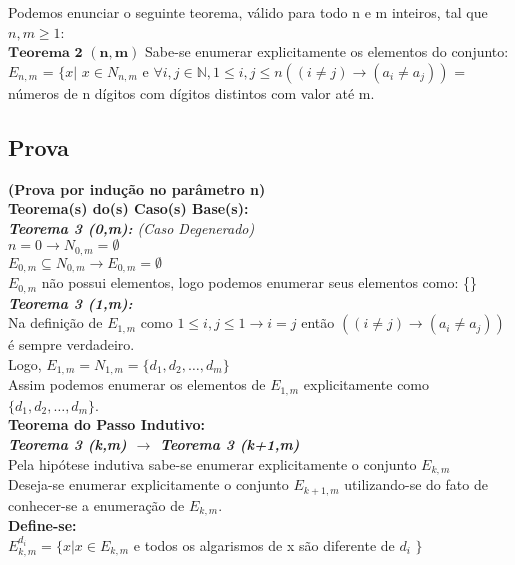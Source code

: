 \documentclass[twoside]{article}
\begin{document}
\begin{multicols}{2}
Podemos enunciar o seguinte teorema, válido para todo n e m inteiros, tal que $n,m\geq1$:\\

$\mathbf{Teorema}$ $\mathbf{2}$ $\mathbf{(n,m)}$ Sabe-se enumerar explicitamente os elementos do conjunto:\\
$E_{n,m}$ = $\{ x | $ $x \in N_{n,m}$ e $\forall i,j \in \mathbb{N}, 1 \leq i,j \leq n ((i \neq j) \rightarrow ( a_i \neq a_j ))$ = números de n dígitos com dígitos distintos com valor até m.

\subsection{ Prova }
\indent \textbf{(Prova por indução no parâmetro n)}\\

\textbf{Teorema(s) do(s) Caso(s) Base(s):}\\

\textit{\textbf{Teorema 3 (0,m):} (Caso Degenerado)}\\
$n=0 \rightarrow N_{0,m} = \emptyset$\\
$E_{0,m} \subseteq N_{0,m} \rightarrow E_{0,m} = \emptyset $\\
$E_{0,m}$ não possui elementos, logo podemos enumerar seus elementos como: \{\}\\

\textit{\textbf{Teorema 3 (1,m):}}\\
Na definição de $E_{1,m}$ como $1 \leq i,j \leq 1 \rightarrow i=j$ então $((i \neq j) \rightarrow ( a_i \neq a_j ))$ é sempre verdadeiro.\\
Logo,  $E_{1,m} = N_{1,m} = \{d_1,d_2,\dots,d_m\}$\\
Assim podemos enumerar os elementos de  $E_{1,m}$ explicitamente como $\{d_1,d_2,\dots,d_m\}$.\\

\textbf{Teorema do Passo Indutivo:}\\

\textit{\textbf{Teorema 3 (k,m) $\rightarrow$ Teorema 3 (k+1,m)}}\\
Pela hipótese indutiva sabe-se enumerar explicitamente o conjunto $E_{k,m}$ \\
Deseja-se enumerar explicitamente o conjunto  $E_{k+1,m}$ utilizando-se do fato de conhecer-se a enumeração de  $E_{k,m}$.\\

\textbf{Define-se:}\\
$E_{k,m}^{d_i} = \{ x | x \in E_{k,m}$ e todos os algarismos de x são diferente de $d_i$ $\}$\\


\end{multicols}
\end{document}
